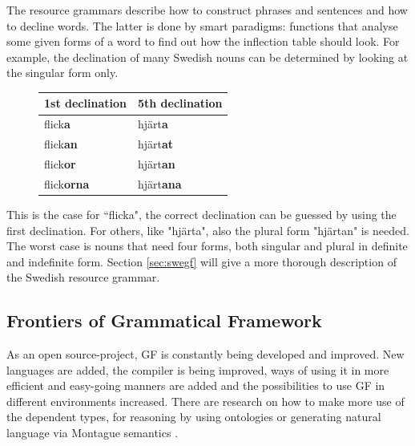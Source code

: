 \documentclass{report}
\begin{document}
The resource grammars describe how to construct phrases and sentences and how to
decline words. The latter is done by smart paradigms: functions that analyse
some given forms of a word to find out how the inflection table should look.
For example, the declination of many Swedish nouns can be determined by looking
at the singular form only. 
\begin{figure}
\begin{tabular}{| l | l |}
\hline
1st declination & 5th declination \\
\hline
flick\textbf{a}    &     hjärt\textbf{a}   \\
flick\textbf{an}    &    hjärt\textbf{at}  \\
flick\textbf{or}    &    hjärt\textbf{an}  \\
flick\textbf{orna}  &    hjärt\textbf{ana} \\
\hline
\end{tabular}
\end{figure}
This is the case for ``flicka", the correct declination
can be guessed by using the first declination. %
For others, like "hjärta", also the plural form "hjärtan" is needed.
The worst case is nouns that need four forms, both singular and
plural in definite and indefinite form.
Section \ref{sec:swegf} will give a more thorough description of the Swedish resource grammar.

\subsection{Frontiers of Grammatical Framework}
As an open source-project, GF is constantly being developed and improved. New
languages are added, the compiler is being improved, ways of using it in more 
efficient and easy-going manners are added
and the possibilities to use GF in different environments
increased. There are research on how to make more use of the dependent
types, for reasoning by using ontologies \cite{ramona} or generating natural
language via Montague semantics \cite{montague}.
\end{document}
